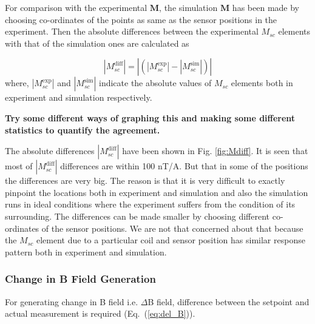 For comparison with the experimental $\bm{M}$, the simulation $\bm{M}$
has been made by choosing co-ordinates of the points as same as the
sensor positions in the experiment. Then the absolute differences
between the experimental $M_{sc}$ elements with that of the simulation
ones are calculated as

\begin{equation}
    |M_{sc}^{\text{diff}}|=|(|M_{sc}^{\text{exp}}|-|M_{sc}^{\text{sim}}|)|
\end{equation}
where, $|M_{sc}^{\text{exp}}|$ and $|M_{sc}^{\text{sim}}|$ indicate the absolute values of $M_{sc}$ elements both in experiment and simulation respectively.


{\bf Try some different ways of graphing this and making some
different statistics to quantify the agreement.}


The absolute differences $|M_{sc}^{\text{diff}}|$ have been shown in Fig. \ref{fig:Mdiff}. It is seen that most of $|M_{sc}^{\text{diff}}|$ differences are within 100 nT/A. But that in some of the positions the differences are very big. The reason is that it is very difficult to exactly pinpoint the locations both in experiment and simulation and also the simulation runs in ideal conditions where the experiment suffers from the condition of its surrounding. The differences can be made smaller by choosing different co-ordinates of the sensor positions. We are not that concerned about that because the $M_{sc}$ element due to a particular coil and sensor position has similar response pattern both in experiment and simulation. 



\subsubsection{Change in B Field Generation}

For generating change in B field i.e. $\Delta$B field, difference between the setpoint and actual measurement is required (Eq.~(\ref{eq:del_B})). 

